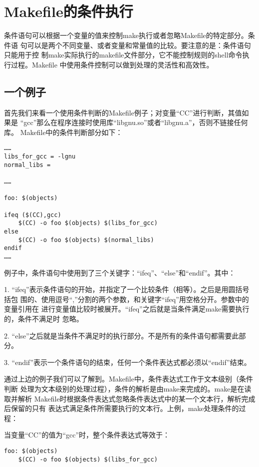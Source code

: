 ﻿\chapter{Makefile的条件执行}
条件语句可以根据一个变量的值来控制make执行或者忽略Makefile的特定部分。条件语
句可以是两个不同变量、或者变量和常量值的比较。要注意的是：条件语句只能用于控
制make实际执行的makefile文件部分，它不能控制规则的shell命令执行过程。Makefile
中使用条件控制可以做到处理的灵活性和高效性。

\section{一个例子}
首先我们来看一个使用条件判断的Makefile例子；对变量“CC”进行判断，其值如果是
“gcc”那么在程序连接时使用库“libgnu.so”或者“libgnu.a”，否则不链接任何库。
Makefile中的条件判断部分如下：

\begin{Verbatim}[]
……
libs_for_gcc = -lgnu
normal_libs =

……

foo: $(objects)

ifeq ($(CC),gcc)
    $(CC) -o foo $(objects) $(libs_for_gcc)
else
    $(CC) -o foo $(objects) $(normal_libs)
endif
……
\end{Verbatim}

例子中，条件语句中使用到了三个关键字：“ifeq”、“else”和“endif”。其中：

1. “ifeq”表示条件语句的开始，并指定了一个比较条件（相等）。之后是用圆括号括包
围的、使用逗号“,”分割的两个参数，和关键字“ifeq”用空格分开。参数中的变量引用在
进行变量值比较时被展开。“ifeq”之后就是当条件满足make需要执行的，条件不满足时
忽略。

2. “else”之后就是当条件不满足时的执行部分。不是所有的条件语句都需要此部分。

3. “endif”表示一个条件语句的结束，任何一个条件表达式都必须以“endif”结束。

通过上边的例子我们可以了解到。Makefile中，条件表达式工作于文本级别（条件判断
处理为文本级别的处理过程），条件的解析是由make来完成的。make是在读取并解析
Makefile时根据条件表达式忽略条件表达式中的某一个文本行，解析完成后保留的只有
表达式满足条件所需要执行的文本行。上例，make处理条件的过程：

当变量“CC”的值为“gcc”时，整个条件表达式等效于：

\begin{Verbatim}[]
foo: $(objects)
    $(CC) -o foo $(objects) $(libs_for_gcc)
\end{Verbatim}

